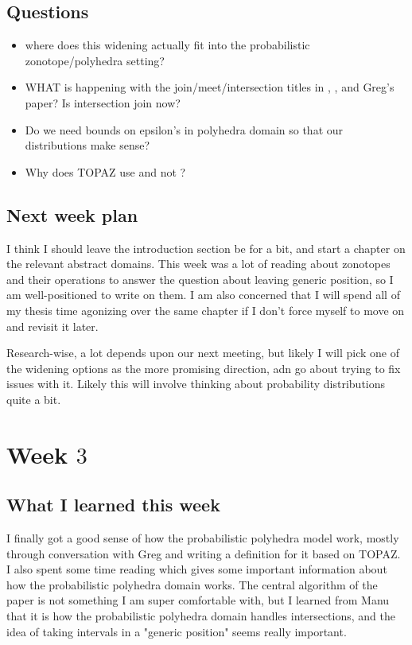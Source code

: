 \documentclass{amsart}
\begin{document}
\subsection{Questions}
\begin{itemize}
  \item where does this widening actually fit into the probabilistic zonotope/polyhedra setting?
  \item WHAT is happening with the join/meet/intersection titles in  \cite{LogicalZonotopeJoin}, \cite{AccurateZonotopeJoin}, and Greg's paper? Is intersection join now?
  \item Do we need bounds on epsilon's in polyhedra domain so that our distributions make sense?
  \item Why does TOPAZ use \cite{LogicalZonotopeJoin} and not \cite{AccurateZonotopeJoin}?
\end{itemize}

\subsection{Next week plan}
I think I should leave the introduction section be for a bit, and start a chapter on the relevant abstract domains.
This week was a lot of reading about zonotopes and their operations to answer the question about leaving generic position, so I am well-positioned to write on them.
I am also concerned that I will spend all of my thesis time agonizing over the same chapter if I don't force myself to move on and revisit it later.

Research-wise, a lot depends upon our next meeting, but likely I will pick one of the widening options as the more promising direction, adn go about trying to fix issues with it.
Likely this will involve thinking about probability distributions quite a bit.


\section{Week $3$}

\subsection{What I learned this week}
I finally got a good sense of how the probabilistic polyhedra model work, mostly through conversation with Greg and writing a definition for it based on TOPAZ. 
I also spent some time reading \cite{LogicalZonotopeJoin} which gives some important information about how the probabilistic polyhedra domain works.
The central algorithm of the paper is not something I am super comfortable with, but I learned from Manu that it is how the probabilistic polyhedra domain handles intersections, and the idea of taking intervals in a "generic position" seems really important.
\end{document}
